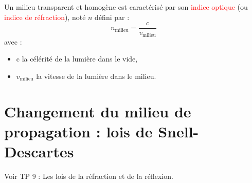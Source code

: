 \begin{tcolorbox}
[colback=green!5!white,colframe=green!75!black,title=\textbf{Indice optique d'un milieu homogène :}]
Un milieu transparent et homogène est caractérisé par son \textcolor{red}{indice optique} (ou \textcolor{red}{indice de réfraction}), noté $n$ défini par :
\begin{equation*}
    n_{\text{milieu}} = \frac{c}{v_{\text{milieu}}}
\end{equation*}
avec :
\begin{itemize}
    \item c la célérité de la lumière dans le vide, 
    \item $v_{\text{milieu}}$ la vitesse de la lumière dans le milieu.
\end{itemize}
\end{tcolorbox}

\section{Changement du milieu de propagation : lois de Snell-Descartes}
\begin{Large}
\end{Large}
Voir TP 9 : Les lois de la réfraction et de la réflexion.
